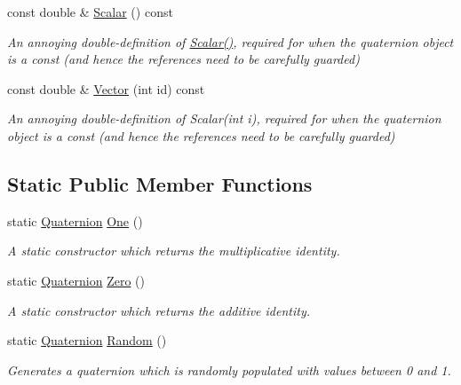 \begin{DoxyCompactItemize}
const double \& \hyperlink{classQDynamics_1_1Quaternion_a1bc0af90c699e7c2eba94833ae7fb105}{Scalar} () const
\begin{DoxyCompactList}\small\item\em An annoying double-\/definition of \hyperlink{classQDynamics_1_1Quaternion_a8121c47a579baffb9e692b8cd2c7dee7}{Scalar()}, required for when the quaternion object is a const (and hence the references need to be carefully guarded) \end{DoxyCompactList}\item 
const double \& \hyperlink{classQDynamics_1_1Quaternion_a061cd74a6e060beeeb781b6cf7b7f16d}{Vector} (int id) const
\begin{DoxyCompactList}\small\item\em An annoying double-\/definition of Scalar(int i), required for when the quaternion object is a const (and hence the references need to be carefully guarded) \end{DoxyCompactList}\end{DoxyCompactItemize}
\subsection*{Static Public Member Functions}
\begin{DoxyCompactItemize}
\item 
static \hyperlink{classQDynamics_1_1Quaternion}{Quaternion} \hyperlink{classQDynamics_1_1Quaternion_a06726eb02ffd68ccbd3adaef63c90bb9}{One} ()
\begin{DoxyCompactList}\small\item\em A static constructor which returns the multiplicative identity. \end{DoxyCompactList}\item 
static \hyperlink{classQDynamics_1_1Quaternion}{Quaternion} \hyperlink{classQDynamics_1_1Quaternion_a7932eeb535080e6230e98fb4f35867c2}{Zero} ()
\begin{DoxyCompactList}\small\item\em A static constructor which returns the additive identity. \end{DoxyCompactList}\item 
static \hyperlink{classQDynamics_1_1Quaternion}{Quaternion} \hyperlink{classQDynamics_1_1Quaternion_a06386710ec4308c04a72f365382472ce}{Random} ()
\begin{DoxyCompactList}\small\item\em Generates a quaternion which is randomly populated with values between 0 and 1. \end{DoxyCompactList}\end{DoxyCompactItemize}
